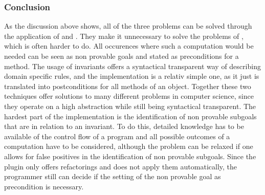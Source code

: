 \subsubsection{Conclusion}
As the discussion above shows, all of the three problems can be solved through the application of  and . They make it unnecessary to solve the problems of , which is often harder to do. All occurences where such a computation would be needed can be seen as non provable goals and stated as preconditions for a method. The usage of invariants offers a syntactical  transparent way of describing domain specific rules, and the implementation is a relativ simple one, as it just is translated into postconditions for all methods of an object. Together these two techniques offer solutions to many different problems in computer science, since they operate on a high abstraction while still being syntactical transparent.\newline 
The hardest part of the implementation is the identification of non provable subgoals that are in relation to an invariant. To do this, detailed knowledge has to be available of the control flow of a program and all possible outcomes of a computation have to be considered, although the problem can be relaxed if one allows for false positives in the identification of non provable subgoals. Since the plugin only offers refactorings and does not apply them automatically, the programmer still can decide if the setting of the non provable goal as precondition is necessary.  
